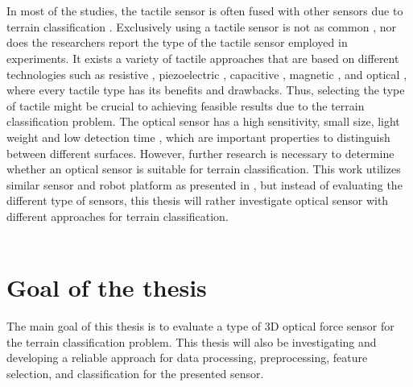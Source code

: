 \documentclass[USenglish]{ifimaster}  %
\begin{document}
\\
\\
In most of the studies, the tactile sensor is often fused with other sensors due to terrain classification \cite{5752869,6849778,Walas2015,Hoffmann20141790,7397881}. Exclusively using a tactile sensor is not as common \cite{6784609,Walas2015}, nor does the researchers report the type of the tactile sensor employed in experiments. It exists a variety of tactile approaches that are based on different technologies such as resistive \cite{928844,4276807,Wisitsoraat200717,351572}, piezoelectric  \cite{4200745,1331377}, capacitive \cite{99980,554353}, magnetic \cite{Chi2004172}, and optical \cite{220165,20431,Nicholls1990,1545264,1381228,7559098,Heo2006312}, where every tactile type has its benefits and drawbacks. Thus, selecting the type of tactile might be crucial to achieving feasible results due to the terrain classification problem. The optical sensor has a high sensitivity, small size, light weight and low detection time \cite{Dutta2016}, which are important properties to distinguish between different surfaces. However, further research is necessary to determine whether an optical sensor is suitable for terrain classification. This work utilizes similar sensor and robot platform as presented in \cite{6784609}, but instead of evaluating the different type of sensors, this thesis will rather investigate optical sensor with different approaches for terrain classification.
\\
\\
\section{Goal of the thesis}
The main goal of this thesis is to evaluate a type of 3D optical force sensor for the terrain classification problem. This thesis will also be investigating and developing a reliable approach for data processing, preprocessing, feature selection, and classification for the presented sensor.
\end{document}
